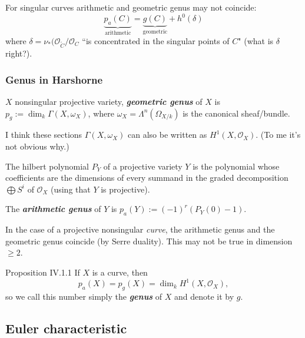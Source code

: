 \begin{upshot}\leavevmode
For singular curves arithmetic and geometric genus may not coincide:
\[\underbrace{p_a(C)}_{\text{arithmetic} }=\underbrace{g(C)}_{\text{geometric} }+h^0(\delta)\]
where \(\delta=\nu_*(\mathcal{O}_{\tilde{C}}/\mathcal{O}_C\) ``is concentrated in the singular points of \(C\)" (what is \(\delta\) right?).

\end{upshot}

\subsubsection{Genus in Harshorne}
\begin{defn}\leavevmode
\(X\) nonsingular projective variety, \textit{\textbf{geometric genus}} of \(X\) is \(p_g:=\dim_k\Gamma(X,\omega_X)\), where \(\omega_X=\Lambda^{n}(\Omega_{X/k})\) is the canonical sheaf/bundle.
\end{defn}

\begin{remark}\leavevmode
I think these sections \(\Gamma(X,\omega_X)\) can also be written as \(H^{1}(X,\mathcal{O}_X)\). (To me it's not obvious why.)
\end{remark}

\begin{defn}[p. 54]\leavevmode
The hilbert polynomial \(P_Y\) of a projective variety  \(Y\) is the polynomial whose coefficients are the dimensions of every summand in the graded decomposition \(\bigoplus S^i\) of \(\mathcal{O}_X\) (using that \(Y\) is projective).

The \textit{\textbf{arithmetic genus}} of \(Y\) is \(p_a(Y):=(-1)^{r}(P_Y(0)-1).\)
\end{defn}

\begin{remark}\leavevmode
	In the case of a projective nonsingular \textit{curve}, the arithmetic genus and the geometric genus coincide (by Serre duality). This may not be true in dimension \(\geq 2\).
\end{remark}

\begin{thing4}{Proposition IV.1.1}\label{prop:IV.1.1}\leavevmode
If \(X\) is a curve, then
\[p_a(X)=p_g(X)=\dim_kH^{1}(X,\mathcal{O}_X),\]
so we call this number simply the \textit{\textbf{genus}} of \(X\) and denote it by \(g\).
\end{thing4}

\subsection{Euler characteristic}

